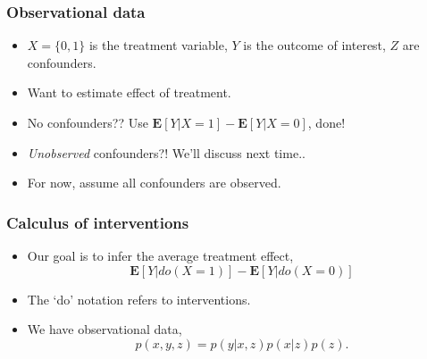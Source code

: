 \documentclass{beamer}
\newcommand{\E}{\textbf{E}}
\begin{document}
\begin{frame}
\frametitle{Observational data}
\begin{center}
\end{center}
\begin{itemize}
\item $X = \{0, 1\}$ is the treatment variable, $Y$ is the outcome of interest, $Z$ are confounders.
\item Want to estimate effect of treatment.
\item No confounders?? Use $\E[Y|X=1] - \E[Y|X = 0]$, done!
\item \emph{Unobserved} confounders?!  We'll discuss next time..
\item For now, assume all confounders are observed.
\end{itemize}
\end{frame}

\begin{frame}
\frametitle{Calculus of interventions}
\begin{itemize}
\item Our goal is to infer the average treatment effect,
\[
\E[Y|do(X=1)] - \E[Y|do(X = 0)]
\]
\item The `do' notation refers to interventions.
\item We have observational data,
\[p(x, y, z) = p(y|x,z)p(x|z)p(z).\]
\end{itemize}
\begin{center}
\end{center}

\end{frame}
\end{document}
